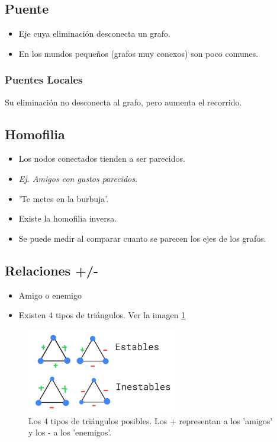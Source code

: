 \documentclass[titlepage,a4paper]{article}
\begin{document}
\subsection*{Puente}
\begin{itemize}
    \item Eje cuya eliminación desconecta un grafo.
    \item En los mundos pequeños (grafos muy conexos) son poco comunes.
\end{itemize}

\subsubsection*{Puentes Locales}
Su eliminación no desconecta al grafo, pero aumenta el recorrido.

\subsection*{Homofilia}
\begin{itemize}
    \item Los nodos conectados tienden a ser parecidos.
    \item \textit{Ej. Amigos con gustos parecidos}.
    \item 'Te metes en la burbuja'.
    \item Existe la homofilia inversa.
    \item Se puede medir al comparar cuanto se parecen los ejes de los grafos.
\end{itemize}

\subsection*{Relaciones +/-}
\begin{itemize}
    \item Amigo o enemigo
    \item Existen 4 tipos de triángulos. Ver la imagen \ref{triangulos}
\end{itemize}

\begin{figure}[!htb]
    \centering
    \includegraphics[width=0.6\textwidth]{imagenesResumen/Triangulos.png}
    \caption{Los 4 tipos de triángulos posibles. Los + representan a los 'amigos' y los - a los 'enemigos'.}
    \label{triangulos}
\end{figure}
\end{document}
